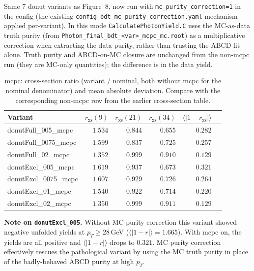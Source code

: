 \documentclass[11pt,a4paper]{article}
\begin{document}
Same 7 donut variants as Figure~8, now run with \texttt{mc\_purity\_correction=1}
in the config (the existing \texttt{config\_bdt\_mc\_purity\_correction.yaml}
mechanism applied per-variant). In this mode \texttt{CalculatePhotonYield.C}
uses the MC-as-data truth purity (from \texttt{Photon\_final\_bdt\_<var>\_mcpc\_mc.root})
as a multiplicative correction when extracting the data purity, rather than
trusting the ABCD fit alone. Truth purity and ABCD-on-MC closure are unchanged
from the non-mcpc run (they are MC-only quantities); the difference is in the
data yield.

\begin{table}[H]
\centering
\caption{mcpc: cross-section ratio (variant / nominal, both without mcpc for the
nominal denominator) and mean absolute deviation.
Compare with the corresponding non-mcpc row from the earlier cross-section table.}
\begin{tabular}{lrrrrr}
\toprule
Variant & $r_\mathrm{xs}(9)$ & $r_\mathrm{xs}(21)$ & $r_\mathrm{xs}(34)$ & $\langle|1-r_\mathrm{xs}|\rangle$ \\
\midrule
donutFull\_005\_mcpc  & $1.534$ & $0.844$ & $0.655$ & $0.282$ \\
donutFull\_0075\_mcpc & $1.599$ & $0.837$ & $0.725$ & $0.257$ \\
donutFull\_02\_mcpc   & $1.352$ & $0.999$ & $0.910$ & $0.129$ \\
donutExcl\_005\_mcpc  & $1.619$ & $0.937$ & $0.673$ & $0.321$ \\
donutExcl\_0075\_mcpc & $1.607$ & $0.929$ & $0.726$ & $0.264$ \\
donutExcl\_01\_mcpc   & $1.540$ & $0.922$ & $0.714$ & $0.220$ \\
donutExcl\_02\_mcpc   & $1.350$ & $0.999$ & $0.911$ & $0.129$ \\
\bottomrule
\end{tabular}
\end{table}

\textbf{Note on \texttt{donutExcl\_005}.} Without MC purity correction this
variant showed negative unfolded yields at $p_T \ge 28$\,GeV ($\langle|1-r|\rangle = 1.665$).
With mcpc on, the yields are all positive and $\langle|1-r|\rangle$ drops to
$0.321$. MC purity correction effectively rescues the pathological variant
by using the MC truth purity in place of the badly-behaved ABCD purity at high $p_T$.
\end{document}
